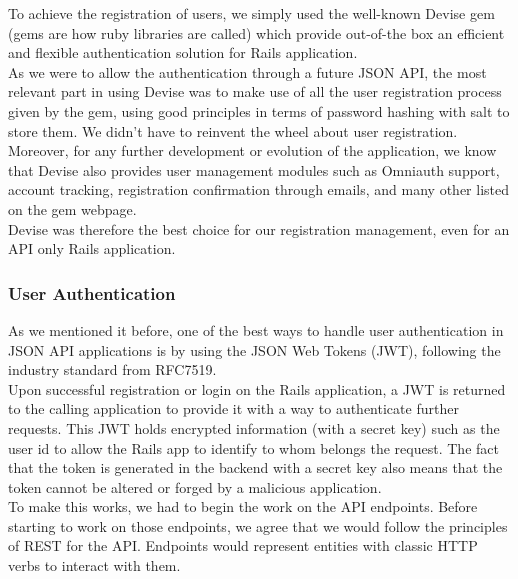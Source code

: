 \documentclass{eplmastersthesis}
\begin{document}
          To achieve the registration of users, we simply used the
          well-known Devise \cite{devise} gem (gems are how ruby libraries are
          called) which provide out-of-the box an efficient and flexible
          authentication solution for Rails application.\\
          As we were to allow the authentication through a future JSON API,
          the most relevant part in using Devise was to make use of all
          the user registration process given by the gem, using good principles
          in terms of password hashing with salt to store them. We didn't
          have to reinvent the wheel about user registration.\\

          Moreover, for any further development or evolution of the application,
          we know that Devise also provides user management modules such as
          Omniauth support, account tracking, registration confirmation
          through emails, and many other listed on the gem webpage.\\

          Devise was therefore the best choice for our registration management,
          even for an API only Rails application.

        \subsubsection{User Authentication}

          As we mentioned it before, one of the best ways to handle user
          authentication in JSON API applications is by using the JSON Web
          Tokens (JWT), following the industry standard from RFC7519.\\

          Upon successful registration or login on the Rails application, a
          JWT is returned to the calling application to provide it with a way
          to authenticate further requests. This JWT holds encrypted
          information (with a secret key) such as the user id to allow the Rails
          app to identify to whom belongs the request. The fact that the token
          is generated in the backend with a secret key also means that the
          token cannot be altered or forged by a malicious application.\\

          To make this works, we had to begin the work on the API endpoints.
          Before starting to work on those endpoints, we agree that we would
          follow the principles of REST \cite{rest} for the API. Endpoints would
          represent entities with classic HTTP verbs to interact with them.\\
\end{document}
